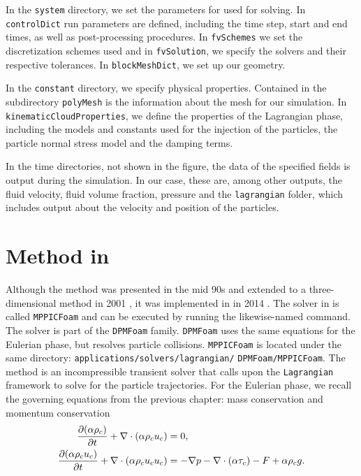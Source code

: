 In the \lstinline|system| directory, we set the parameters for used for solving. In \lstinline|controlDict| run parameters are defined, including the time step, start and end times, as well as post-processing procedures. In \lstinline|fvSchemes| we set the discretization schemes used and in \lstinline|fvSolution|, we specify the solvers and their respective tolerances. In \lstinline|blockMeshDict|, we set up our geometry.

In the \lstinline|constant| directory, we specify physical properties. Contained in the subdirectory \lstinline|polyMesh| is the information about the mesh for our simulation. In \lstinline|kinematicCloudProperties|, we define the properties of the Lagrangian phase, including the models and constants used for the injection of the particles, the particle normal stress model and the damping terms.

In the time directories, not shown in the figure, the data of the specified fields is output during the simulation. In our case, these are, among other outputs, the fluid velocity, fluid volume fraction, pressure and the \lstinline|lagrangian| folder, which includes output about the velocity and position of the particles.

\section{\MP Method in \OF}
Although the \MP method was presented in the mid 90s \cite{MPPICFirst} and extended to a three-dimensional method in 2001 \cite{MPInterpolation}, it was implemented in \OF in 2014 \cite{OFMPIntro}.
The solver in \OF is called \lstinline|MPPICFoam| and can be executed by running the likewise-named command.
The solver is part of the \lstinline|DPMFoam| family. \lstinline|DPMFoam| uses the same equations for the Eulerian phase, but resolves particle collisions. \lstinline|MPPICFoam| is located under the same directory: \lstinline|applications/solvers/lagrangian/| \lstinline|DPMFoam/MPPICFoam|. 
The \MP method is an incompressible transient solver that calls upon the \lstinline|Lagrangian| framework to solve for the particle trajectories. 
For the Eulerian phase, we recall the governing equations from the previous chapter: mass conservation and momentum conservation
\begin{align}
    \dfrac{\partial (\alpha \rho_c)}{\partial t} + \nabla \cdot (\alpha \rho_c u_c) &= 0, \\
    \dfrac{\partial (\alpha \rho_c u_c)}{\partial t} + \nabla \cdot (\alpha \rho_c u_c u_c) &= - \nabla p -\nabla \cdot (\alpha \tau_c)  - F + \alpha \rho_c g .
\end{align}


